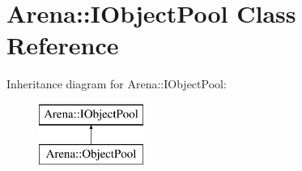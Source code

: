 \hypertarget{class_arena_1_1_i_object_pool}{\section{Arena\+:\+:I\+Object\+Pool Class Reference}
\label{class_arena_1_1_i_object_pool}
}
Inheritance diagram for Arena\+:\+:I\+Object\+Pool\+:\begin{figure}[H]
\begin{center}
\leavevmode
\includegraphics[height=2.000000cm]{class_arena_1_1_i_object_pool}
\end{center}
\end{figure}
